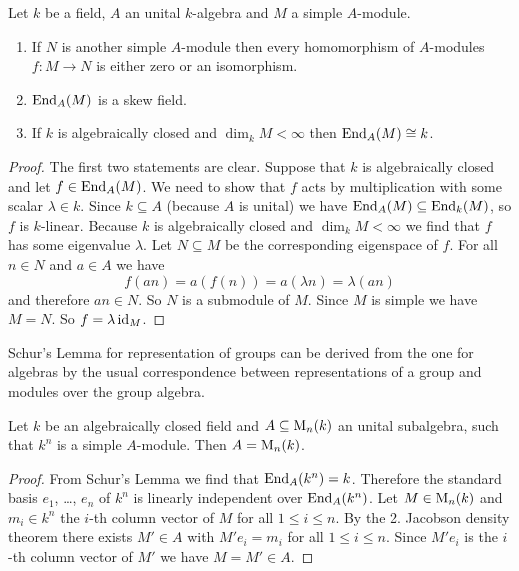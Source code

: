 \begin{lem}
 Let $k$ be a field, $A$ an unital $k$-algebra and $M$ a simple $A$-module.
 \begin{enumerate}[label=\emph{\alph*})]
  \item
   If $N$ is another simple $A$-module then every homomorphism of $A$-modules $f \colon M \to N$ is either zero or an isomorphism.
  \item
   $\operatorname{End}_A(M)$ is a skew field.
  \item
   If $k$ is algebraically closed and $\dim_k M < \infty$ then $\operatorname{End}_A(M) \cong k$.
 \end{enumerate}
\end{lem}
\begin{proof}
 The first two statements are clear. Suppose that $k$ is algebraically closed and let $f \in \operatorname{End}_A(M)$. We need to show that $f$ acts by multiplication with some scalar $\lambda \in k$. Since $k \subseteq A$ (because $A$ is unital) we have $\operatorname{End}_A(M) \subseteq \operatorname{End}_k(M)$, so $f$ is $k$-linear. Because $k$ is algebraically closed and $\dim_k M < \infty$ we find that $f$ has some eigenvalue $\lambda$. Let $N \subseteq M$ be the corresponding eigenspace of $f$. For all $n \in N$ and $a \in A$ we have
 \[
  f(an) = a(f(n)) = a(\lambda n) = \lambda(an)
 \]
 and therefore $an \in N$. So $N$ is a submodule of $M$. Since $M$ is simple we have $M = N$. So $f = \lambda \operatorname{id}_M$.
\end{proof}


\begin{rem}
 Schur’s Lemma for representation of groups can be derived from the one for algebras by the usual correspondence between representations of a group and modules over the group algebra.
\end{rem}


\begin{cor}
 Let $k$ be an algebraically closed field and $A \subseteq \operatorname{M}_n(k)$ an unital subalgebra, such that $k^n$ is a simple $A$-module. Then $A = \operatorname{M}_n(k)$.
\end{cor}
\begin{proof}
 From Schur’s Lemma we find that $\operatorname{End}_A(k^n) = k$. Therefore the standard basis $e_1$, \dots, $e_n$ of $k^n$ is linearly independent over $\operatorname{End}_A(k^n)$. Let $M \in \operatorname{M}_n(k)$ and $m_i \in k^n$ the $i$-th column vector of $M$ for all $1 \leq i \leq n$. By the 2. Jacobson density theorem there exists $M' \in A$ with $M' e_i = m_i$ for all $1 \leq i \leq n$. Since $M' e_i$ is the $i$-th column vector of $M'$ we have $M = M' \in A$.
\end{proof}


